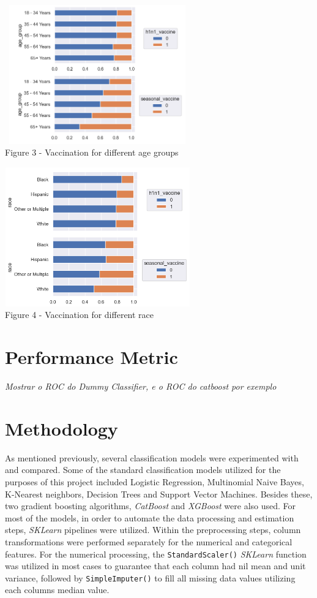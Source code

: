 \documentclass{IEEEtran}
\begin{document}
\begin{center}
    \includegraphics[width = 8cm,height=6cm]{figures/Age.png}\\  Figure 3 - Vaccination for different age groups
\end{center}
\begin{center}
    \includegraphics[width = 8cm,height=6cm]{figures/Race.png}\\  Figure 4 - Vaccination for different race
\end{center}


\section{Performance Metric}


\textit{Mostrar o ROC do Dummy Classifier, e o ROC do catboost por exemplo}

\section{Methodology}

As mentioned previously, several classification models were experimented with and compared. Some of the standard classification models utilized for the purposes of this project included Logistic Regression, Multinomial Naive Bayes, K-Nearest neighbors, Decision Trees and Support Vector Machines. Besides these, two gradient boosting algorithms, \textit{CatBoost} and \textit{XGBoost} were also used.
For most of the models, in order to automate the data processing and estimation steps, \textit{SKLearn} pipelines were utilized. Within the preprocessing steps, column transformations were performed separately for the numerical and categorical features. For the numerical processing, the \texttt{StandardScaler()} \textit{SKLearn} function was utilized in most cases to guarantee that each column had nil mean and unit variance, followed by \texttt{SimpleImputer()} to fill all missing data values utilizing each columns median value.
\end{document}
